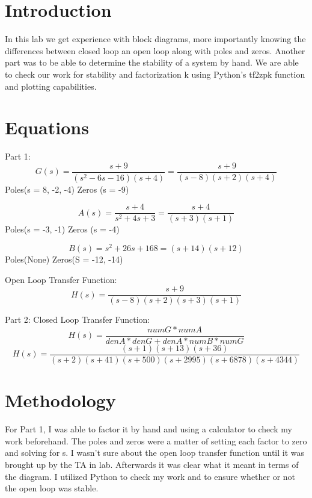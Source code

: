 \documentclass[12pt]{report}
\begin{document}
\section{Introduction}
 

In this lab we get experience with block diagrams, more importantly knowing the differences between closed loop an open loop along with poles and zeros. Another part was to be able to determine the stability of a system by hand. We are able to check our work for stability and factorization k using Python's tf2zpk function and plotting capabilities. 

\section{Equations}
Part 1:
\begin{equation*}
G(s) = \frac{s+9}{(s^2-6s-16)(s+4)} = \frac{s+9}{(s-8)(s+2)(s+4)}
\end{equation*}
Poles(s = 8, -2, -4) Zeros (s = -9)

\begin{equation*}
A(s) = \frac{s+4}{s^2+4s+3} = \frac{s+4}{(s+3)(s+1)} 
\end{equation*}
Poles(s = -3, -1) Zeros (s = -4)

\begin{equation*}
B(s)= s^2+26s+168 = (s+14)(s+12)
\end{equation*}
Poles(None) Zeros(S = -12, -14)

Open Loop Transfer Function:
\begin{equation*}
H(s) = \frac{s+9}{(s-8)(s+2)(s+3)(s+1)}
\end{equation*}

Part 2:
Closed Loop Transfer Function:
\begin{equation*}
H(s) = \frac{numG*numA}{denA*denG + denA*numB*numG}
\end{equation*}
\begin{equation*}
H(s) = \frac{(s+1)(s+13)(s+36)}{(s+2)(s+41)(s+500)(s+2995)(s+6878)(s+4344)}
\end{equation*}



\section{Methodology}

For Part 1, I was able to factor it by hand and using a calculator to check my work beforehand. The poles and zeros were a matter of setting each factor to zero and solving for s. I wasn't sure about the open loop transfer function until it was brought up by the TA in lab. Afterwards it was clear what it meant in terms of the diagram. I utilized Python to check my work and to ensure whether or not the open loop was stable. 
\end{document}
